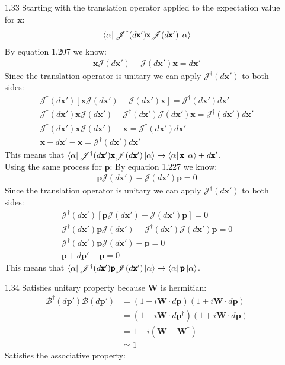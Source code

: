 \documentclass[12pt]{article}
\newcommand{\opx}{\pmb{\text{x}}}
\newcommand{\jac}{\mathscr{J}(d\opx')}
\newcommand{\jacdag}{\mathscr{J}^{\dag}(d\opx')}
\newcommand{\opp}{\pmb{\text{p}}}
\newcommand{\boost}{\mathscr{B}(d\opp')}
\newcommand{\boostdag}{\mathscr{B}^{\dag}(d\opp')}
\newcommand{\opw}{\pmb{\text{W}}}
\begin{document}
\begin{enumerate}
    \item[1.33] Starting with the translation operator applied to the expectation value for $\opx$:
    \begin{gather*}
      \bra{\alpha}\jacdag\opx\jac\ket{\alpha}\\
    \end{gather*}
    By equation 1.207 we know:
    \begin{gather*}
      \opx\jac-\jac\opx=d\opx'
    \end{gather*}
    Since the translation operator is unitary we can apply $\jacdag$ to both sides:
    \begin{gather*}
      \jacdag\left[\opx\jac-\jac\opx\right]=\jacdag d\opx'\\
      \jacdag \opx\jac-\jacdag\jac\opx=\jacdag d\opx'\\
      \jacdag \opx\jac-\opx=\jacdag d\opx'\\
      \opx+d\opx'-\opx=\jacdag d\opx'
    \end{gather*}
    This means that $\bra{\alpha}\jacdag\opx\jac\ket{\alpha}\rightarrow\bra{\alpha}\opx\ket{\alpha}+d\opx'$.\\
    Using the same process for $\opp$:
    By equation 1.227 we know:
    \begin{gather*}
      \opp\jac-\jac\opp=0
    \end{gather*}
    Since the translation operator is unitary we can apply $\jacdag$ to both sides:
    \begin{gather*}
      \jacdag\left[\opp\jac-\jac\opp\right]=0\\
      \jacdag \opp\jac-\jacdag\jac\opp=0\\
      \jacdag \opp\jac-\opp=0\\
      \opp+d\opp'-\opp=0
    \end{gather*}
    This means that $\bra{\alpha}\jacdag\opp\jac\ket{\alpha}\rightarrow\bra{\alpha}\opp\ket{\alpha}$.\\
    \item[1.34] Satisfies unitary property because $\opw$ is hermitian:
    \begin{align*}
      \boostdag\boost&=(1-i\opw\cdot d\opp)(1+i\opw\cdot d\opp)\\
      &=(1-i\opw\cdot d\opp^{\dagger})(1+i\opw\cdot d\opp)\\
      &=1-i(\opw-\opw^{\dagger})\\
      &\simeq 1
    \end{align*}
    Satisfies the associative property:
    \begin{align*}

\end{align*}
\end{enumerate}
\end{document}
